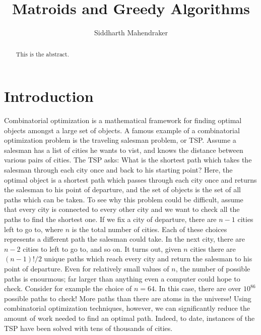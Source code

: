 \documentclass[a4paper,11pt]{report}
\begin{document}
\title{Matroids and Greedy Algorithms}
\author{Siddharth Mahendraker}

\maketitle

\begin{abstract}
This is the abstract.
\end{abstract}

\setcounter{secnumdepth}{3}
\renewcommand{\thesection}{\arabic{section}.0}
\renewcommand{\cftsecfont}{\bfseries}
\setlength\cftbeforesecskip{3pt}
\setlength\cftbeforesubsecskip{3pt}

\setcounter{page}{1}
\tableofcontents
\clearpage
\setcounter{page}{1}

\section{Introduction}

Combinatorial optimization is a mathematical framework for finding optimal
objects amongst a large set of objects. A famous example of a combinatorial
optimization problem is the traveling salesman problem, or TSP. Assume a
salesman has a list of cities he wants to vist, and knows the distance
between various pairs of cities. The TSP asks: What is the shortest path
which takes the salesman through each city once and back to his starting
point? Here, the optimal object is a shortest path which passes through each
city once and returns the salesman to his point of departure, and the set of
objects is the set of all paths which can be taken. To see why this problem
could be difficult, assume that every city is connected to every other city
and we want to check all the paths to find the shortest one. If we fix a
city of departure, there are $n-1$ cities left to go to, where $n$ is the
total number of cities. Each of these choices represents a different path
the salesman could take. In the next city, there are $n-2$ cities to left to
go to, and so on. It turns out, given $n$ cities there are $(n-1)!/2$ unique
paths which reach every city and return the salesman to his point of
departure. Even for relatively small values of $n$, the number of possible
paths is enourmous; far larger than anything even a computer could hope to
check. Consider for example the choice of $n = 64$. In this case, there are
over $10^{86}$ possible paths to check! More paths than there are atoms in
the universe! Using combinatorial optimization techniques, however, we can
significantly reduce the amount of work needed to find an optimal path.
Indeed, to date, instances of the TSP have been solved with tens of thousands
of cities.
\end{document}
